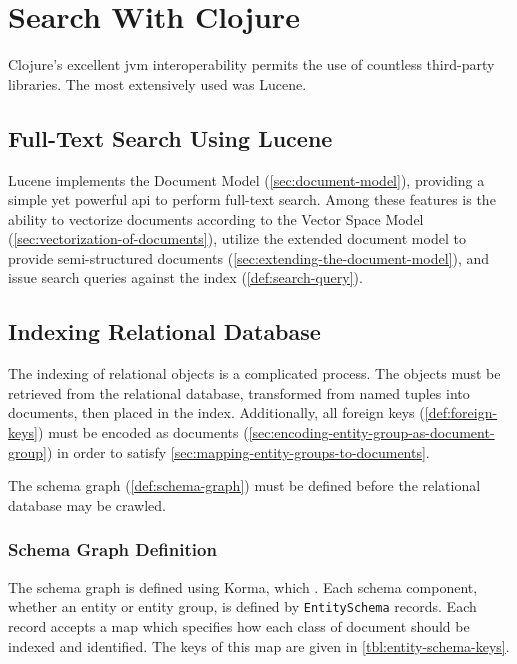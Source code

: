 \section{Search With Clojure}
\label{sec:search-with-clojure}
	Clojure's excellent \gls{jvm} interoperability permits the use of countless third-party libraries.  The most extensively used was Lucene.
	
	\subsection{Full-Text Search Using Lucene}
		  Lucene implements the Document Model (\cref{sec:document-model}), providing a simple yet powerful \gls{api} to perform full-text search.  Among these features is the ability to vectorize documents according to the Vector Space Model (\cref{sec:vectorization-of-documents}), utilize the extended document model to provide semi-structured documents (\cref{sec:extending-the-document-model}), and issue search queries against the index (\cref{def:search-query}).
	
	\subsection{Indexing Relational Database}
		The indexing of relational objects is a complicated process.  The objects must be retrieved from the relational database, transformed from named tuples into documents, then placed in the index.  Additionally, all foreign keys (\cref{def:foreign-keys}) must be encoded as documents (\cref{sec:encoding-entity-group-as-document-group}) in order to satisfy \cref{sec:mapping-entity-groups-to-documents}.
		
		The schema graph (\cref{def:schema-graph}) must be defined before the relational database may be crawled.
		
		\subsubsection{Schema Graph Definition}
		\label{sec:entity-schema}
			The schema graph is defined using Korma, which .  Each schema component, whether an entity or entity group, is defined by \texttt{EntitySchema} records.  Each record accepts a map which specifies how each class of document should be indexed and identified.  The keys of this map are given in \vref{tbl:entity-schema-keys}.
			

